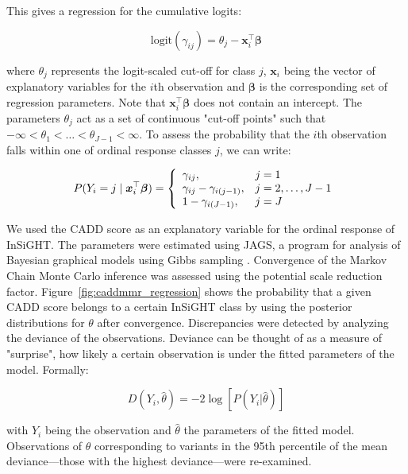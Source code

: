 \noindent This gives a regression for the cumulative logits:

\begin{equation*}
  \text{logit}(\gamma_{ij}) = \theta_j - \bm{x}^\top_i\bm{\beta}
\end{equation*}

\noindent where $\theta_j$ represents the logit-scaled cut-off for class $j$,  $\bm{x}_i$ being the vector of explanatory variables for the $i$th observation and $\bm{\beta}$ is the corresponding set of regression parameters.
Note that $\bm{x}^\top_i\bm{\beta}$ does not contain an intercept.
The parameters $\theta_j$ act as a set of continuous "cut-off points" such that \mbox{$-\infty < \theta_1 < \ldots < \theta_{J-1} < \infty$}.
To assess the probability that the $i$th observation falls within one of ordinal response classes $j$, we can write:

\[ P(Y_{i}=j \mid \bm{x}^\top_i\bm{\beta}) =
\left\{
\begin{array}{l l}
  \gamma_{ij}, & \text{$j = 1$}\\
  \gamma_{ij} - \gamma_{i(j-1)},  & \text{$j=2,\dots,J-1$} \\
  1 - \gamma_{i(J-1)}, & \text{$j = J$}\\
\end{array} \right.\]

We used the CADD score as an explanatory variable for the ordinal response of InSiGHT.
The parameters were estimated using JAGS, a program for analysis of Bayesian graphical models using Gibbs sampling \cite{Plummer_2003}.
Convergence of the Markov Chain Monte Carlo inference was assessed using the potential scale reduction factor\cite{Plummer_2006, Gelman_1992}.
Figure~\ref{fig:caddmmr_regression} shows the probability that a given CADD score belongs to a certain InSiGHT class by using the posterior distributions for $\theta$ after convergence.
Discrepancies were detected by analyzing the deviance of the observations.
Deviance can be thought of as a measure of "surprise", how likely a certain observation is under the fitted parameters of the model.
Formally:

\begin{equation*}
D(Y_i, \hat{\theta}) = -2\log[P(Y_i|\hat{\theta})]
\end{equation*}

\noindent with $Y_i$ being the observation and $\hat{\theta}$ the parameters of the fitted model.
Observations of $\theta$ corresponding to variants in the 95th percentile of the mean deviance---those with the highest deviance---were re-examined.

